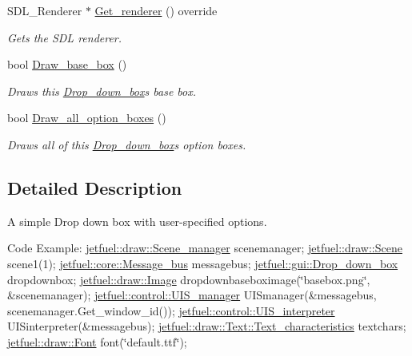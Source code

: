 \begin{DoxyCompactItemize}
S\+D\+L\+\_\+\+Renderer $\ast$ \hyperlink{classjetfuel_1_1gui_1_1Drop__down__box_ab8beac8ed8b442d96723f72a2fe9edb6}{Get\+\_\+renderer} () override
\begin{DoxyCompactList}\small\item\em Gets the S\+DL renderer. \end{DoxyCompactList}\item 
bool \hyperlink{classjetfuel_1_1gui_1_1Drop__down__box_a7bc0f38e40897db13797e4937a50c334}{Draw\+\_\+base\+\_\+box} ()
\begin{DoxyCompactList}\small\item\em Draws this \hyperlink{classjetfuel_1_1gui_1_1Drop__down__box}{Drop\+\_\+down\+\_\+box}\textquotesingle{}s base box. \end{DoxyCompactList}\item 
bool \hyperlink{classjetfuel_1_1gui_1_1Drop__down__box_ae29b89b98fa3211ead2fffc712ce264f}{Draw\+\_\+all\+\_\+option\+\_\+boxes} ()
\begin{DoxyCompactList}\small\item\em Draws all of this \hyperlink{classjetfuel_1_1gui_1_1Drop__down__box}{Drop\+\_\+down\+\_\+box}\textquotesingle{}s option boxes. \end{DoxyCompactList}\end{DoxyCompactItemize}


\subsection{Detailed Description}
A simple Drop down box with user-\/specified options.

Code Example\+: \hyperlink{classjetfuel_1_1draw_1_1Scene__manager}{jetfuel\+::draw\+::\+Scene\+\_\+manager} scenemanager; \hyperlink{classjetfuel_1_1draw_1_1Scene}{jetfuel\+::draw\+::\+Scene} scene1(1); \hyperlink{classjetfuel_1_1core_1_1Message__bus}{jetfuel\+::core\+::\+Message\+\_\+bus} messagebus; \hyperlink{classjetfuel_1_1gui_1_1Drop__down__box}{jetfuel\+::gui\+::\+Drop\+\_\+down\+\_\+box} dropdownbox; \hyperlink{classjetfuel_1_1draw_1_1Image}{jetfuel\+::draw\+::\+Image} dropdownbaseboximage(\char`\"{}basebox.\+png\char`\"{}, \&scenemanager); \hyperlink{classjetfuel_1_1control_1_1UIS__manager}{jetfuel\+::control\+::\+U\+I\+S\+\_\+manager} U\+I\+Smanager(\&messagebus, scenemanager.\+Get\+\_\+window\+\_\+id()); \hyperlink{classjetfuel_1_1control_1_1UIS__interpreter}{jetfuel\+::control\+::\+U\+I\+S\+\_\+interpreter} U\+I\+Sinterpreter(\&messagebus); \hyperlink{structjetfuel_1_1draw_1_1Text_1_1Text__characteristics}{jetfuel\+::draw\+::\+Text\+::\+Text\+\_\+characteristics} textchars; \hyperlink{classjetfuel_1_1draw_1_1Font}{jetfuel\+::draw\+::\+Font} font(\char`\"{}default.\+ttf\char`\"{});

